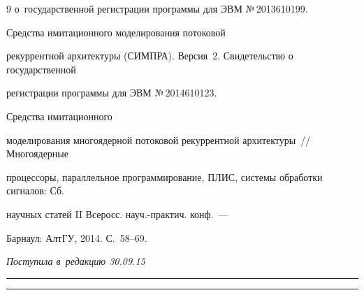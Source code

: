 {{\begin{thebibliography}{9}
о~государственной регистрации программы для ЭВМ №\,2013610199.


 Средства имитационного моделирования потоковой 

рекуррентной архитектуры (СИМПРА). Версия~2. Свидетельство о государственной 

регистрации программы для ЭВМ №\,2014610123.


 Средства имитационного 

моделирования многоядерной потоковой рекуррентной архитектуры~/\!\!/ Многоядерные 

процессоры, параллельное программирование, ПЛИС, системы обработки сигналов: Сб. 

научных статей II Всеросс. науч.-практич. конф.~--- 

Барнаул: АлтГУ, 2014. С.~58--69.

   \end{thebibliography}

} }





\vspace*{-9pt}



\hfill{\small\textit{Поступила в~редакцию 30.09.15}}









\vspace*{9pt}



\hrule



\vspace*{2pt}



\hrule










\def\tit{HARDWARE AND SOFTWARE MODELING AND~TESTING OF~THE~RECURRENT OPERATIONAL DEVICE}



\def\titkol{Hardware and software modeling and testing of the recurrent operational device}





